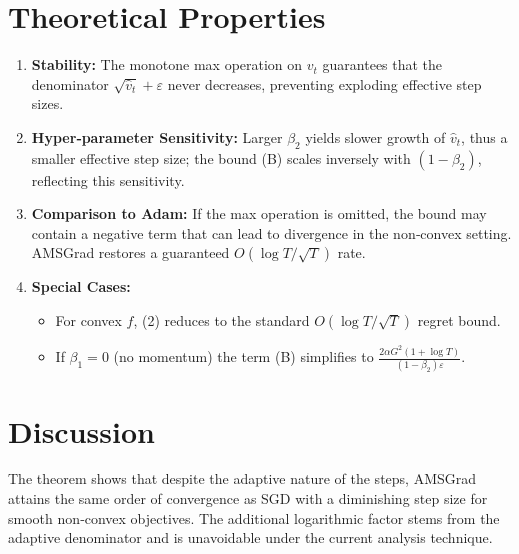 \documentclass[11pt]{article}
\begin{document}
\section*{Theoretical Properties}
\begin{enumerate}[label=\arabic*.]
\item \textbf{Stability:} The monotone max operation on $v_t$ guarantees that the denominator $\sqrt{\hat v_t}+\varepsilon$ never decreases, preventing exploding effective step sizes.
\item \textbf{Hyper‑parameter Sensitivity:} Larger $\beta_2$ yields slower growth of $\hat v_t$, thus a smaller effective step size; the bound (B) scales inversely with $(1-\beta_2)$, reflecting this sensitivity.
\item \textbf{Comparison to Adam:} If the max operation is omitted, the bound may contain a negative term that can lead to divergence in the non‑convex setting. AMSGrad restores a guaranteed $O(\log T/\sqrt{T})$ rate.
\item \textbf{Special Cases:}
    \begin{itemize}
        \item For convex $f$, (2) reduces to the standard $O(\log T/\sqrt{T})$ regret bound.
        \item If $\beta_1=0$ (no momentum) the term (B) simplifies to $\frac{2\alpha G^2(1+\log T)}{(1-\beta_2)\varepsilon}$.
    \end{itemize}
\end{enumerate}

\section*{Discussion}
The theorem shows that despite the adaptive nature of the steps, AMSGrad attains the same order of convergence as SGD with a diminishing step size for smooth non‑convex objectives. The additional logarithmic factor stems from the adaptive denominator and is unavoidable under the current analysis technique.

\end{document}
